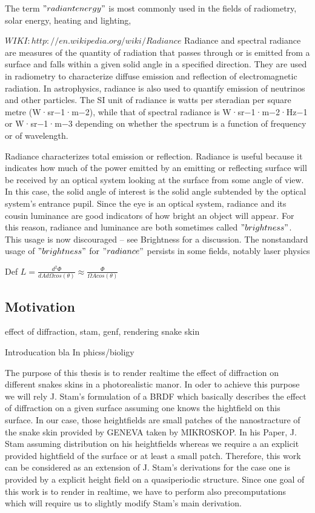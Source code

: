 The term $"radiant energy"$ is most commonly used in the fields of radiometry, solar energy, heating and lighting,


$WIKI: http://en.wikipedia.org/wiki/Radiance$
Radiance and spectral radiance are measures of the quantity of radiation that passes through or is emitted from a surface and falls within a given solid angle in a specified direction. They are used in radiometry to characterize diffuse emission and reflection of electromagnetic radiation. In astrophysics, radiance is also used to quantify emission of neutrinos and other particles. The SI unit of radiance is watts per steradian per square metre (W·sr−1·m−2), while that of spectral radiance is W·sr−1·m−2·Hz−1 or W·sr−1·m−3 depending on whether the spectrum is a function of frequency or of wavelength.

Radiance characterizes total emission or reflection. Radiance is useful because it indicates how much of the power emitted by an emitting or reflecting surface will be received by an optical system looking at the surface from some angle of view. In this case, the solid angle of interest is the solid angle subtended by the optical system's entrance pupil. Since the eye is an optical system, radiance and its cousin luminance are good indicators of how bright an object will appear. For this reason, radiance and luminance are both sometimes called $"brightness"$. This usage is now discouraged – see Brightness for a discussion. The nonstandard usage of $"brightness"$ for $"radiance"$ persists in some fields, notably laser physics

Def $L = \frac{d^2 \Phi}{dA d\Omega cos(\theta)} \approx \frac{\Phi}{\Omega A cos(\theta)}$


\subsection{Motivation}
effect of diffraction, stam, genf, rendering snake skin 

Introducation
bla 
In phicss/bioligy

The purpose of this thesis is to render realtime the effect of diffraction on different snakes skins in a photorealistic manor. In oder to achieve this purpose we will rely J. Stam's formulation of a BRDF which basically describes the effect of diffraction on a given surface assuming one knows the hightfield on this surface.
In our case, those heightfields are small patches of the nanostracture of the snake skin provided by GENEVA taken by MIKROSKOP.
In his Paper, J. Stam assuming distribution on his heightfields whereas we require a an explicit provided hightfield of the surface or at least a small patch. Therefore, this work can be considered as an extension of J. Stam's derivations for the case one is provided by a explicit height field on a quasiperiodic structure.
Since one goal of this work is to render in realtime, we have to perform also precomputations which will require us to slightly modify Stam's main derivation.


